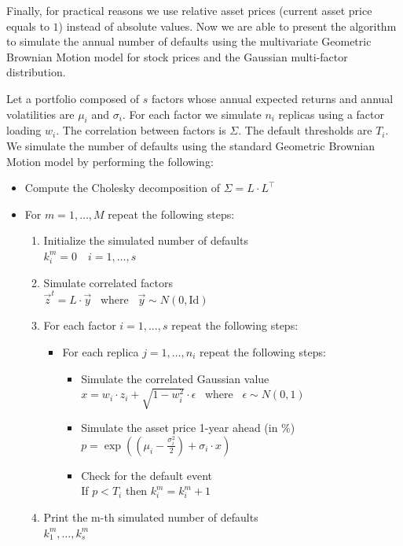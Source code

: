 \documentclass[11pt,fleqn]{book} %
\begin{document}
Finally, for practical reasons we use relative asset prices (current asset price 
equals to $1$) instead of absolute values. Now we are able to present the algorithm
to simulate the annual number of defaults using the multivariate Geometric Brownian 
Motion model for stock prices and the Gaussian multi-factor distribution.

\begin{algorithm}
	\label{alg:sdumm}
	Let a portfolio composed of $s$ factors whose annual expected returns and 
	annual volatilities are $\mu_i$ and $\sigma_i$. For each factor we simulate 
	$n_i$ replicas using a factor loading $w_i$. The correlation between factors 
	is $\Sigma$. The default thresholds are $T_i$.
	We simulate the number of defaults using the standard Geometric Brownian 
	Motion model by performing the following:
	\begin{itemize}
		\item Compute the Cholesky decomposition of $\Sigma = L \cdot L^\intercal$
		\item For $m=1,\dots,M$ repeat the following steps:
		\begin{enumerate}
			\item Initialize the simulated number of defaults \\ 
			$k_i^m=0 \quad i=1,\dots,s$
			\item Simulate correlated factors \\
			$\vec{z}^t = L \cdot \vec{y}$ ~where~ $\vec{y} \sim N(0,\text{Id})$
			\item For each factor $i=1,\dots,s$ repeat the following steps:
			\begin{itemize}
				\item For each replica $j=1,\dots,n_i$ repeat the following steps:
				\begin{itemize}
					\item Simulate the correlated Gaussian value \\
					$x = w_i \cdot z_i + \sqrt{1-w_i^2} \cdot \epsilon$ ~where~ $\epsilon \sim N(0,1)$
					\item Simulate the asset price 1-year ahead (in \%)\\
					$p = \exp\left(\left(\mu_i - \frac{\sigma_i^2}{2}\right) + \sigma_i \cdot x\right)$
					\item Check for the default event \\
					If $p < T_i$ then $k_i^m = k_i^m + 1$
				\end{itemize}
			\end{itemize}
			\item Print the m-th simulated number of defaults \\
			$k_1^m,\dots,k_s^m$
		\end{enumerate}
	\end{itemize}
\end{algorithm}
\end{document}
